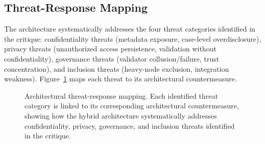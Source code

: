 \documentclass[AMA,LATO1COL]{WileyNJD-v2}
\begin{document}
\subsection{Threat-Response Mapping}\label{subsec:threats}

The architecture systematically addresses the four threat categories identified in the critique: confidentiality threats (metadata exposure, case-level overdisclosure), privacy threats (unauthorized access persistence, validation without confidentiality), governance threats (validator collusion/failure, trust concentration), and inclusion threats (heavy-node exclusion, integration weakness). Figure~\ref{fig:threats} maps each threat to its architectural countermeasure.

\begin{figure}[!ht]
\centering
{}
\caption{Architectural threat-response mapping. Each identified threat category is linked to its corresponding architectural countermeasure, showing how the hybrid architecture systematically addresses confidentiality, privacy, governance, and inclusion threats identified in the critique.}\label{fig:threats}
\end{figure}

%
%
%
%
\end{document}
